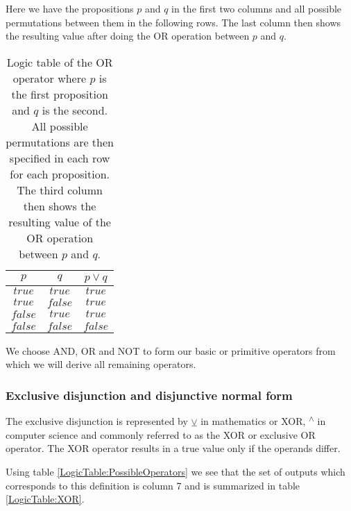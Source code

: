                 Here we have the propositions $p$ and $q$ in the first two columns and all possible permutations between them in the following rows. The last column then shows the resulting value after doing the OR operation between $p$ and $q$.
                
                \begin{table}[h!]
                    \centering
                    \begin{tabular}{|c|c|c|}
                    	\hline
                    	  $p$   &   $q$   & $p \vee q$ \\ \hline
                    	$true$  & $true$  &   $true$   \\ \hline
                    	$true$  & $false$ &   $true$   \\ \hline
                    	$false$ & $true$  &   $true$   \\ \hline
                    	$false$ & $false$ &  $false$   \\ \hline
                    \end{tabular}
                    \caption{Logic table of the OR operator where $p$ is the first proposition and $q$ is the second. All possible permutations are then specified in each row for each proposition. The third column then shows the resulting value of the OR operation between $p$ and $q$.}
                    \label{LogicTable:OR}
                \end{table}
            
                We choose AND, OR and NOT to form our basic or primitive operators from which we will derive all remaining operators.
                
            \subsubsection{Exclusive disjunction and disjunctive normal form}
                
                The exclusive disjunction is represented by $\veebar$ in mathematics or XOR, \textsuperscript{$\wedge$} in computer science and commonly referred to as the XOR or exclusive OR operator. The XOR operator results in a true value only if the operands differ.
                
                Using table \ref{LogicTable:PossibleOperators} we see that the set of outputs which corresponds to this definition is column 7 and is summarized in table \ref{LogicTable:XOR}.
                

